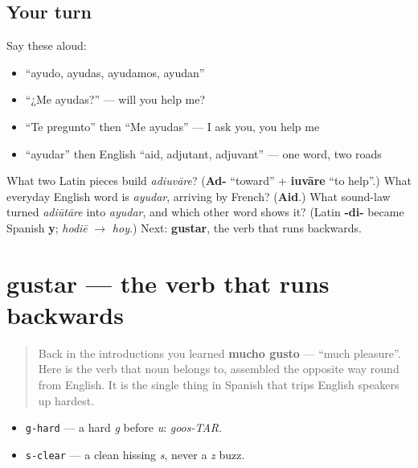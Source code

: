 \subsection*{Your turn}
Say these aloud:

\begin{itemize}
\raggedright
  \item \textquotedblleft{}ayudo, ayudas, ayudamos, ayudan\textquotedblright{}
  \item \textquotedblleft{}¿Me ayudas?\textquotedblright{} — will you help me?
  \item \textquotedblleft{}Te pregunto\textquotedblright{} then \textquotedblleft{}Me ayudas\textquotedblright{} — I ask you, you help me
  \item \textquotedblleft{}ayudar\textquotedblright{} then English \textquotedblleft{}aid, adjutant, adjuvant\textquotedblright{} — one word, two roads
\end{itemize}

\begin{tcolorbox}[breakable,colback=teal!4,colframe=teal!35!black,title={Before you move on}]
What two Latin pieces build \emph{adiuvāre}? (\textbf{Ad-} \textquotedblleft{}toward\textquotedblright{} + \textbf{iuvāre} \textquotedblleft{}to help\textquotedblright{}.) What everyday English word is \emph{ayudar}, arriving by French? (\textbf{Aid}.) What sound-law turned \emph{adiūtāre} into \emph{ayudar}, and which other word shows it? (Latin \textbf{-di-} became Spanish \textbf{y}; \emph{hodiē} $\to$ \emph{hoy}.) Next: \textbf{gustar}, the verb that runs backwards.
\end{tcolorbox}
\section[gustar]{gustar — the verb that runs backwards}

\label{lesson:ES-C35-gustar}



\begin{quote}
Back in the introductions you learned \textbf{mucho gusto} — \textquotedblleft{}much pleasure\textquotedblright{}. Here is the verb that noun belongs to, assembled the opposite way round from English. It is the single thing in Spanish that trips English speakers up hardest.
\end{quote}

\begin{sounds}
\begin{itemize}
\raggedright
  \item \texttt{g-hard} — a hard \emph{g} before \emph{u}: \emph{goos-TAR}.
  \item \texttt{s-clear} — a clean hissing \emph{s}, never a \emph{z} buzz.
\end{itemize}
\end{sounds}

